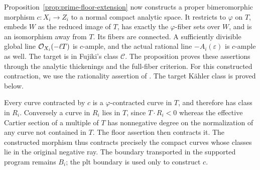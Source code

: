Proposition~\ref{prop:prime-floor-extension} now constructs a proper
bimeromorphic morphism \(c:X_i\to Z_i\) to a normal compact analytic
space.  It restricts to \(\varphi\) on \(T\), embeds \(W\) as the
reduced image of \(T\), has exactly the \(\varphi\)-fiber sets over
\(W\), and is an isomorphism away from \(T\).  Its fibers are
connected.  A sufficiently divisible global line \(\mathcal O_{X_i}(-\ell T)\)
is \(c\)-ample, and the actual rational line
\(-A_i(\varepsilon)\) is \(c\)-ample as well.  The target is in
Fujiki's class \(\mathcal C\).  The proposition proves these assertions
through the analytic thickenings and the full-fiber criterion.  For this
constructed contraction, we use the rationality assertion of
\cite[Remark~5.11]{DasHacon2024OnMMP}.  The target K\"ahler class is
proved below.

Every curve contracted by \(c\) is a \(\varphi\)-contracted curve in
\(T\), and therefore has class in \(R_i\).  Conversely a curve in
\(R_i\) lies in \(T\), since \(T\cdot R_i<0\) whereas the effective
Cartier section of a multiple of \(T\) has nonnegative degree on the
normalization of any curve not contained in \(T\).  The floor assertion
then contracts it.  The constructed morphism thus contracts precisely
the compact curves whose classes lie in the original negative ray.
The boundary transported in the supported
program remains \(B_i\); the plt boundary is used only to construct \(c\).


